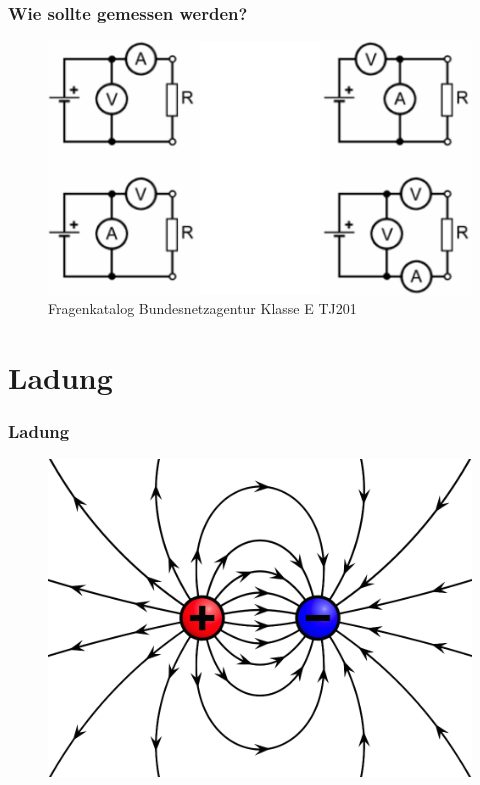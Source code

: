 \begin{frame}
  \frametitle{Wie sollte gemessen werden?}
  \begin{figure}
    \includegraphics[width=\textwidth,height=.75\textheight,keepaspectratio]{e02/stromSpannung.png}
    \caption{Fragenkatalog Bundesnetzagentur Klasse E TJ201}
  \end{figure}
\end{frame}

\section*{Ladung}

\begin{frame}
  \frametitle{Ladung}
  \begin{center}
    \begin{figure}
      \includegraphics[width=\textwidth,height=.75\textheight,keepaspectratio]{e02/ladung.png}
    \end{figure}
  \end{center}
\end{frame}

